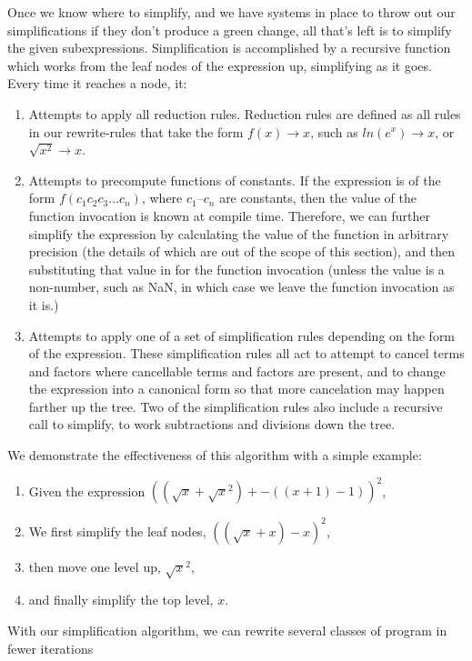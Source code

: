 \documentclass{article}
\newcommand{\lnexp}[1]{ln\left(e^{#1}\right)}
\newcommand{\sqrsqrt}[1]{\sqrt{#1}^2}
\begin{document}
Once we know where to simplify, 
and we have systems in place 
to throw out our simplifications 
if they don't produce a green change, 
all that's left is to simplify the given subexpressions. 
Simplification is accomplished 
by a recursive function 
which works from the leaf nodes 
of the expression up, 
simplifying as it goes. 
Every time it reaches a node, it:

\begin{enumerate}
\item Attempts to apply all reduction rules. 
Reduction rules are defined as all rules 
in our rewrite-rules 
that take the form $f(x) \to x$, 
such as $\lnexp{x} \to x$, 
or $\sqrt{x^2} \to x$.

\item Attempts to precompute functions of constants. 
If the expression 
is of the form $f(c_1 c_2 c_3... c_n)$, 
where $c_1$--$c_n$ are constants, 
then the value of the function invocation 
is known at compile time. 
Therefore, we can further simplify the expression 
by calculating the value of the function 
in arbitrary precision 
(the details of which are out of the scope of this section), 
and then substituting that value 
in for the function invocation 
(unless the value is a non-number, 
such as NaN, 
in which case we leave the function invocation 
as it is.)

\item Attempts to apply one 
of a set of simplification rules 
depending on the form of the expression. 
These simplification rules 
all act to attempt to cancel terms and factors 
where cancellable terms and factors are present, 
and to change the expression into a canonical form 
so that more cancelation may happen 
farther up the tree. 
Two of the simplification rules 
also include a recursive call to simplify, 
to work subtractions and divisions down the tree.
\end{enumerate}

We demonstrate the effectiveness of this algorithm 
with a simple example:

\begin{enumerate}
\item Given the expression
$((\sqrt{x} + \sqrsqrt{x}) + -((x + 1) - 1))^2$,
\item We first simplify the leaf nodes,
$((\sqrt{x} + x) -x)^2$,
\item then move one level up, 
$\sqrt{x}^2$,
\item and finally simplify the top level,
$x$.
\end{enumerate}

With our simplification algorithm, 
we can rewrite several classes of program
in fewer iterations
\end{document}
